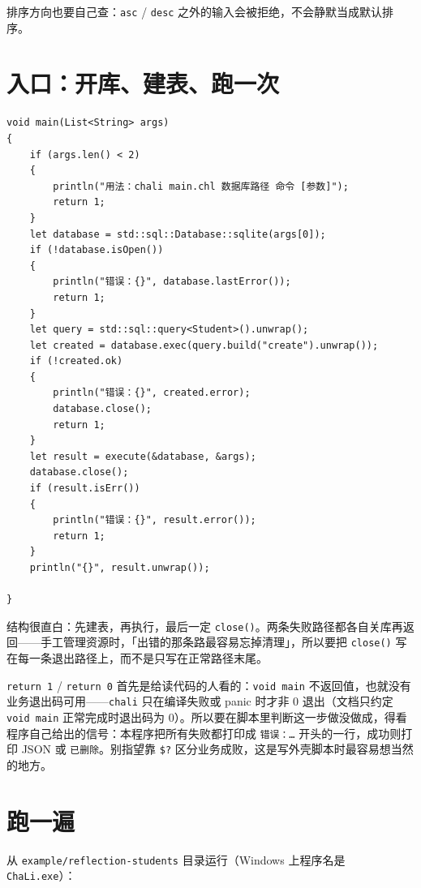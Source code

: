 排序方向也要自己查：\texttt{asc} / \texttt{desc} 之外的输入会被拒绝，不会静默当成默认排序。

\section{入口：开库、建表、跑一次}

\par
\medskip
\begin{lstlisting}[style=chali]
void main(List<String> args)
{
    if (args.len() < 2)
    {
        println("用法：chali main.chl 数据库路径 命令 [参数]");
        return 1;
    }
    let database = std::sql::Database::sqlite(args[0]);
    if (!database.isOpen())
    {
        println("错误：{}", database.lastError());
        return 1;
    }
    let query = std::sql::query<Student>().unwrap();
    let created = database.exec(query.build("create").unwrap());
    if (!created.ok)
    {
        println("错误：{}", created.error);
        database.close();
        return 1;
    }
    let result = execute(&database, &args);
    database.close();
    if (result.isErr())
    {
        println("错误：{}", result.error());
        return 1;
    }
    println("{}", result.unwrap());

}
\end{lstlisting}
\par
\medskip

结构很直白：先建表，再执行，最后一定 \texttt{close(\allowbreak{})\allowbreak{}}。两条失败路径都各自关库再返回——手工管理资源时，「出错的那条路最容易忘掉清理」，所以要把 \texttt{close(\allowbreak{})\allowbreak{}} 写在每一条退出路径上，而不是只写在正常路径末尾。

\texttt{return 1} / \texttt{return 0} 首先是给读代码的人看的：\texttt{void main} 不返回值，也就没有业务退出码可用——\texttt{chali} 只在编译失败或 panic 时才非 0 退出（文档只约定 \texttt{void main} 正常完成时退出码为 0）。所以要在脚本里判断这一步做没做成，得看程序自己给出的信号：本程序把所有失败都打印成 \texttt{错误：…} 开头的一行，成功则打印 JSON 或 \texttt{已删除}。别指望靠 \texttt{\$?} 区分业务成败，这是写外壳脚本时最容易想当然的地方。

\section{跑一遍}

从 \texttt{example/\allowbreak{}reflection-students} 目录运行（Windows 上程序名是 \texttt{Cha\allowbreak{}Li.\allowbreak{}exe}）：

